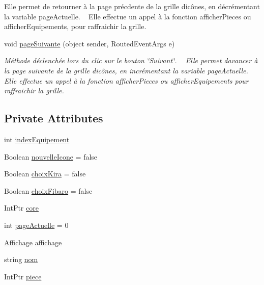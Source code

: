 \begin{DoxyCompactItemize}
\begin{DoxyCompactList}
Elle permet de retourner à la page précdente de la grille d\textquotesingle{}icônes, en décrémentant la variable page\+Actuelle. ~\newline
Elle effectue un appel à la fonction afficher\+Pieces ou afficher\+Equipements, pour raffraichir la grille. \end{DoxyCompactList}\item 
void \hyperlink{class_my_domotik_1_1_gestion_equipements_a1154e2f4fac7640eadec7702b0526ab2}{page\+Suivante} (object sender, Routed\+Event\+Args e)
\begin{DoxyCompactList}\small\item\em Méthode déclenchée lors du clic sur le bouton \char`\"{}\+Suivant\char`\"{}. ~\newline
Elle permet d\textquotesingle{}avancer à la page suivante de la grille d\textquotesingle{}icônes, en incrémentant la variable page\+Actuelle. ~\newline
Elle effectue un appel à la fonction afficher\+Pieces ou afficher\+Equipements pour raffraichir la grille. \end{DoxyCompactList}\end{DoxyCompactItemize}
\subsection*{Private Attributes}
\begin{DoxyCompactItemize}
\item 
int \hyperlink{class_my_domotik_1_1_gestion_equipements_a97158e3ed7c64a65cd0c4b622ba1e859}{index\+Equipement}
\item 
Boolean \hyperlink{class_my_domotik_1_1_gestion_equipements_ad45240c0362eff36ba4a8ac65cc654c2}{nouvelle\+Icone} = false
\item 
Boolean \hyperlink{class_my_domotik_1_1_gestion_equipements_a8cfb37128fab5e3d9a6ec086c5f15b19}{choix\+Kira} = false
\item 
Boolean \hyperlink{class_my_domotik_1_1_gestion_equipements_a931bcae29b85b50fe0805a1afccadda4}{choix\+Fibaro} = false
\item 
Int\+Ptr \hyperlink{class_my_domotik_1_1_gestion_equipements_a82c5ff73bf002b9bc1a92e5d380cb252}{core}
\item 
int \hyperlink{class_my_domotik_1_1_gestion_equipements_a87d2835bb2e08eeb5a1e0c047f11b958}{page\+Actuelle} = 0
\item 
\hyperlink{class_my_domotik_1_1_affichage}{Affichage} \hyperlink{class_my_domotik_1_1_gestion_equipements_a0b38f0169712b6eb70f54669c2f06b45}{affichage}
\item 
string \hyperlink{class_my_domotik_1_1_gestion_equipements_a02ac90d607b1f1e7df10e2cf35341526}{nom}
\item 
Int\+Ptr \hyperlink{class_my_domotik_1_1_gestion_equipements_a23d0e0a3640ee3bca3b1b163f65ab57b}{piece}
\end{DoxyCompactItemize}


